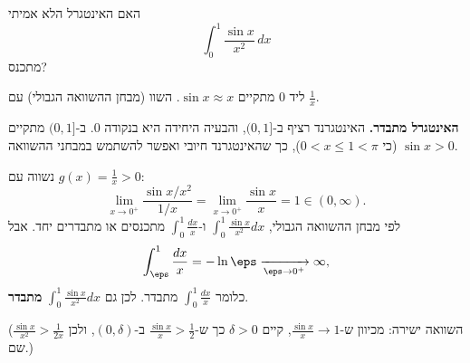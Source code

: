 
\begin{question}
האם האינטגרל הלא אמיתי
\[ \int_0^1\frac{\sin x}{x^2}\,dx \]
מתכנס?
\end{question}

\begin{hint}
ליד $0$ מתקיים $\sin x\approx x$. השוו (מבחן ההשוואה הגבולי) עם $\frac1x$.
\end{hint}

\begin{solution}
\textbf{האינטגרל מתבדר.}
האינטגרנד רציף ב-$(0,1]$, והבעיה היחידה היא בנקודה $0$. ב-$(0,1]$ מתקיים $\sin x>0$ (כי $0<x\le1<\pi$), כך שהאינטגרנד חיובי ואפשר להשתמש במבחני ההשוואה.

נשווה עם $g(x)=\frac1x>0$:
\[ \lim_{x\to0^+}\frac{\sin x/x^2}{1/x}=\lim_{x\to0^+}\frac{\sin x}{x}=1\in(0,\infty). \]
לפי מבחן ההשוואה הגבולי, $\int_0^1\frac{\sin x}{x^2}dx$ ו-$\int_0^1\frac{dx}{x}$ מתכנסים או מתבדרים יחד. אבל
\[ \int_\eps^1\frac{dx}{x}=-\ln\eps\xrightarrow[\eps\to0^+]{}\infty, \]
כלומר $\int_0^1\frac{dx}{x}$ מתבדר. לכן גם $\int_0^1\frac{\sin x}{x^2}dx$ \textbf{מתבדר}.

(השוואה ישירה: מכיוון ש-$\frac{\sin x}{x}\to1$, קיים $\delta>0$ כך ש-$\frac{\sin x}{x}>\frac12$ ב-$(0,\delta)$, ולכן $\frac{\sin x}{x^2}>\frac{1}{2x}$ שם.)
\end{solution}

